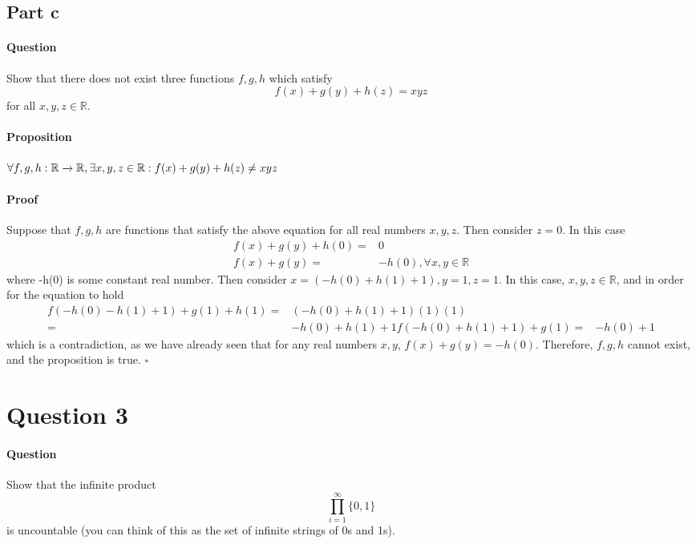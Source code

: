 \documentclass{article}
\begin{document}
\subsection{Part c}
\paragraph{Question} Show that there does not exist three functions $f,g,h$ which satisfy
\begin{equation*}
    f(x) + g(y) + h(z) = xyz
\end{equation*}
\noindent for all $x,y,z \in \mathbb{R}$.
\paragraph{Proposition} $\forall f,g,h: \mathbb{R}\xrightarrow{}\mathbb{R}, \exists x,y,z \in \mathbb{R} : f(x)+g(y)+h(z)\neq xyz$
\vspace{-10pt}
\paragraph{Proof} Suppose that $f,g,h$ are functions that satisfy the above equation for all real numbers $x,y,z$. Then consider $z=0$. In this case
\begin{align*}
    f(x) + g(y) + h(0) =& 0\\
    f(x) + g(y) =& -h(0), \forall x,y \in \mathbb{R}
\end{align*}
\noindent where -h(0) is some constant real number. Then consider $x = (-h(0)+h(1)+1), y = 1, z = 1$. In this case, $x,y,z \in \mathbb{R}$, and in order for the equation to hold
\begin{align*}
    f(-h(0)-h(1)+1) + g(1) + h(1) =& (-h(0)+h(1)+1)(1)(1)\\
    =& -h(0)+h(1)+1
    f(-h(0)+h(1)+1)+g(1) =& -h(0)+1
\end{align*}
\noindent which is a contradiction, as we have already seen that for any real numbers $x,y$, $f(x)+g(y) = -h(0)$. Therefore, $f,g,h$ cannot exist, and the proposition is true. $\square$
\pagebreak
\section{Question 3}
\paragraph{Question} Show that the infinite product
\begin{equation*}
    \displaystyle\prod_{i=1}^{\infty}\{0,1\}
\end{equation*}
\noindent is uncountable (you can think of this as the set of infinite strings of 0s and 1s).
\end{document}
